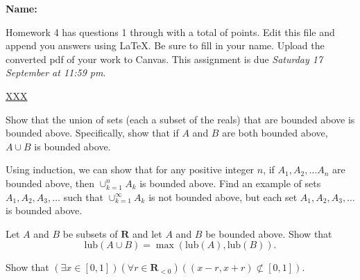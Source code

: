 \documentclass[12pt,fleqn,answers]{exam}
\newcommand{\reals}{\mathbf{R}}
\newcommand{\lub}{\mathrm{lub}}
\newcommand{\union}{\cup}
\newcommand\PM{{\sc pm}}
\newcommand{\quiz}{4}
\newcommand{\term}{Fall}
\newcommand{\due}{Saturday 17 September  at 11:59 \PM}
\begin{document}
\large
\vspace{0.1in}
\noindent{}
{\bf Name:}  \\
\noindent \makebox[3.0truein][l]{\bf Homework \quiz, \term \/ \the\year}
\vspace{0.1in}

\begin{quote}
    \end{quote}
\noindent  Homework    \quiz\/  has questions 1 through  \numquestions \/ with a total of  \numpoints\/  points.   Edit this file and append you answers using La\TeX. Be sure to fill in your name. Upload the converted pdf of your work to Canvas.   This assignment is due \emph{\due}.

\vspace{0.1in}

\url{XXX}

\begin{questions} 


\question [5] Show that the union of sets (each a subset of the reals) that are 
bounded above is bounded above. Specifically, show that if $A$ and $B$ are both 
bounded above, $A \union B$ is bounded above.

\question [5] Using induction, we can show that for any positive integer $n$, 
if $A_1, A_2, \dots A_n$ are bounded above, then $\union_{k=1}^n A_k$ is bounded above. 
Find an example of sets $A_1, A_2, A_3, \dots$ such that 
$\displaystyle \union_{k=1}^\infty A_k$ is not bounded above, but each set  $A_1, A_2, A_3, \dots$
is bounded above.

\question [5] Let $A$ and $B$ be subsets of \(\reals\) and let $A$ and $B$ be bounded above.
Show that 
\[
    \lub(A \union B) = \max(\lub(A), \lub(B)).
\]

\question [5] Show that
\(
     \left(\exists x \in [0,1] \right)
     \left(\forall r \in \reals_{<0}\right)
     \left (\left(x-r, x+r \right) \not \subset [0,1] \right)
\).

\end{questions}
\end{document}

